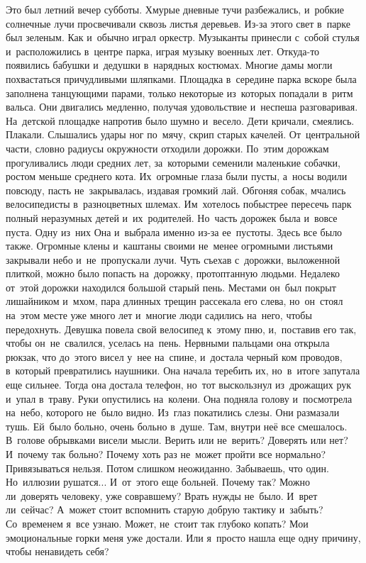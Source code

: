  
\lettrine[lines=3, loversize=0.1]{Э}{}то был летний вечер субботы.
Хмурые дневные тучи разбежались, и~робкие солнечные лучи просвечивали сквозь листья деревьев.
Из-за этого свет в~парке был зеленым.
Как и~обычно играл оркестр.
Музыканты принесли с~собой стулья и~расположились в~центре парка, играя музыку военных лет.
Откуда-то появились бабушки и~дедушки в~нарядных костюмах.
Многие дамы могли похвастаться причудливыми шляпками.
Площадка в~середине парка вскоре была заполнена танцующими парами, только некоторые из~которых попадали в~ритм вальса.
Они двигались медленно, получая удовольствие и~неспеша разговаривая.
На~детской площадке напротив было шумно и~весело.
Дети кричали, смеялись.
Плакали.
Слышались удары ног по~мячу, скрип старых качелей.
От~центральной части, словно радиусы окружности отходили дорожки.
По~этим дорожкам прогуливались люди средних лет, за~которыми семенили маленькие собачки, ростом меньше среднего кота.
Их~огромные глаза были пусты, а~носы водили повсюду, пасть не~закрывалась, издавая громкий лай.
Обгоняя собак, мчались велосипедисты в~разноцветных шлемах.
Им~хотелось побыстрее пересечь парк полный неразумных детей и~их~родителей.
Но~часть дорожек была и~вовсе пуста.
Одну из~них Она и~выбрала именно из-за ее~пустоты.
Здесь все было также.
Огромные клены и~каштаны своими не~менее огромными листьями закрывали небо и~не~пропускали лучи.
Чуть съехав с~дорожки, выложенной плиткой, можно было попасть на~дорожку, протоптанную людьми.
Недалеко от~этой дорожки находился большой старый пень.
Местами он~был покрыт лишайником и~мхом, пара длинных трещин рассекала его слева, но~он~стоял на~этом месте уже много лет и~многие люди садились на~него, чтобы передохнуть.
Девушка повела свой велосипед к~этому пню, и,~поставив его так, чтобы он~не~свалился, уселась на~пень.
Нервными пальцами она открыла рюкзак, что до~этого висел у~нее на~спине, и~достала черный ком проводов, в~который превратились наушники.
Она начала теребить их, но~в~итоге запутала еще сильнее.
Тогда она достала телефон, но~тот выскользнул из~дрожащих рук и~упал в~траву.
Руки опустились на~колени.
Она подняла голову и~посмотрела на~небо, которого не~было видно.
Из~глаз покатились слезы.
Они размазали тушь.
Ей~было больно, очень больно в~душе.
Там, внутри неё все смешалось.
В~голове обрывками висели мысли.
Верить или не~верить? Доверять или нет? И~почему так больно? Почему хоть раз не~может пройти все нормально? Привязываться нельзя.
Потом слишком неожиданно.
Забываешь, что один.
Но~иллюзии рушатся...
И~от~этого еще больней.
Почему так? Можно ли~доверять человеку, уже совравшему? Врать нужды не~было.
И~врет ли~сейчас? А~может стоит вспомнить старую добрую тактику и~забыть? Со~временем я~все узнаю.
Может, не~стоит так глубоко копать? Мои эмоциональные горки меня уже достали.
Или я~просто нашла еще одну причину, чтобы ненавидеть себя? 

